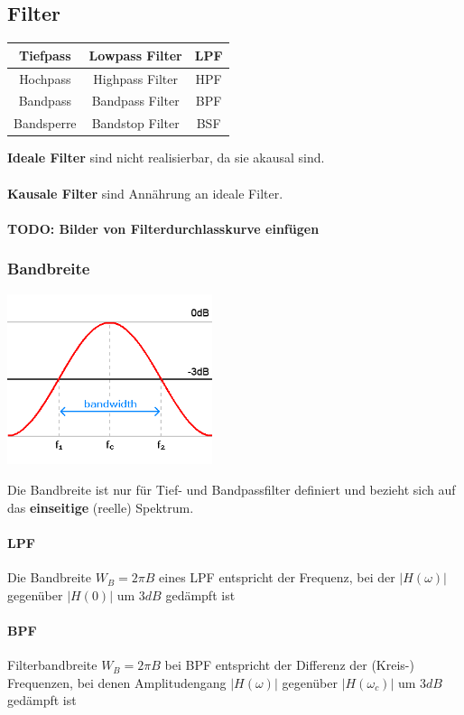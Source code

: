 	\subsection{Filter}
		\begin{multicols}{2}
			\begin{center}
				\begin{tabular}{|c|c|c|}
					\hline
					Tiefpass & Lowpass Filter & LPF \\
					\hline
					Hochpass & Highpass Filter & HPF \\
					\hline
					Bandpass & Bandpass Filter & BPF \\
					\hline
					Bandsperre & Bandstop Filter & BSF \\
					\hline
				\end{tabular}
			\end{center}
		\columnbreak

		\textbf{Ideale Filter} sind nicht realisierbar, da sie akausal sind.\\ \\
		\textbf{Kausale Filter} sind Ann\"ahrung an ideale Filter. \\ \\
		\textbf{TODO: Bilder von Filterdurchlasskurve einfügen}
	\end{multicols}

	\subsubsection{Bandbreite}
	\begin{minipage}{7cm}
		\includegraphics[width=6cm]{bilder/filter_bandbreite.png}
	\end{minipage}
	\begin{minipage}{11cm}
		Die Bandbreite ist nur für Tief- und Bandpassfilter definiert und bezieht sich auf das \textbf{einseitige} (reelle) Spektrum.
		\paragraph{LPF}	
			Die Bandbreite $W_B = 2 \pi B$ eines LPF entspricht der Frequenz, bei der $|H(\omega)|$ gegenüber $|H(0)|$ um $3 dB$ gedämpft ist
		\paragraph{BPF}	
			Filterbandbreite $W_B = 2 \pi B$ bei BPF entspricht der Differenz der (Kreis-) Frequenzen, bei denen Amplitudengang $|H(\omega)|$ gegenüber $|H(\omega_c)|$ um $3 dB$ gedämpft ist
	\end{minipage}


